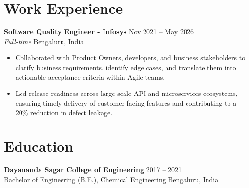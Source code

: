 \documentclass[10pt,a4paper]{article}
\begin{document}
\section{Work Experience}
\textbf{Software Quality Engineer - Infosys} \hfill Nov 2021 -- May 2026 \\
\textit{Full-time} \hfill Bengaluru, India
\begin{itemize}
    \item Collaborated with Product Owners, developers, and business stakeholders to clarify business requirements, identify edge cases, and translate them into actionable acceptance criteria within Agile teams.
    \item Led release readiness across large-scale API and microservices ecosystems, ensuring timely delivery of customer-facing features and contributing to a 20\% reduction in defect leakage.
\end{itemize}
\vspace{1pt}

\section{Education}
\textbf{Dayananda Sagar College of Engineering} \hfill 2017 -- 2021 \\
Bachelor of Engineering (B.E.), Chemical Engineering \hfill Bengaluru, India
\end{document}
